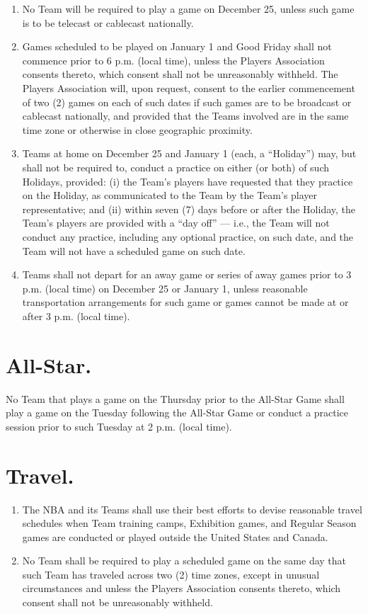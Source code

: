 \documentclass[
]{book}
\providecommand{\tightlist}{%
  \setlength{\itemsep}{0pt}\setlength{\parskip}{0pt}}
\begin{document}
\begin{enumerate}
\def\labelenumi{(\alph{enumi})}
\tightlist
\item
  No Team will be required to play a game on December 25, unless such game is to be telecast or cablecast nationally.
\item
  Games scheduled to be played on January 1 and Good Friday shall not commence prior to 6 p.m. (local time), unless the Players Association consents thereto, which consent shall not be unreasonably withheld. The Players Association will, upon request, consent to the earlier commencement of two (2) games on each of such dates if such games are to be broadcast or cablecast nationally, and provided that the Teams involved are in the same time zone or otherwise in close geographic proximity.
\item
  Teams at home on December 25 and January 1 (each, a ``Holiday'') may, but shall not be required to, conduct a practice on either (or both) of such Holidays, provided: (i) the Team's players have requested that they practice on the Holiday, as communicated to the Team by the Team's player representative; and (ii) within seven (7) days before or after the Holiday, the Team's players are provided with a ``day off'' --- i.e., the Team will not conduct any practice, including any optional practice, on such date, and the Team will not have a scheduled game on such date.
\item
  Teams shall not depart for an away game or series of away games prior to 3 p.m. (local time) on December 25 or January 1, unless reasonable transportation arrangements for such game or games cannot be made at or after 3 p.m. (local time).
\end{enumerate}

\hypertarget{all-star.}{%
\section{All-Star.}\label{all-star.}}

No Team that plays a game on the Thursday prior to the All-Star Game shall play a game on the Tuesday following the All-Star Game or conduct a practice session prior to such Tuesday at 2 p.m. (local time).

\hypertarget{travel.}{%
\section{Travel.}\label{travel.}}

\begin{enumerate}
\def\labelenumi{(\alph{enumi})}
\tightlist
\item
  The NBA and its Teams shall use their best efforts to devise reasonable travel schedules when Team training camps, Exhibition games, and Regular Season games are conducted or played outside the United States and Canada.
\item
  No Team shall be required to play a scheduled game on the same day that such Team has traveled across two (2) time zones, except in unusual circumstances and unless the Players Association consents thereto, which consent shall not be unreasonably withheld.
\end{enumerate}
\end{document}
